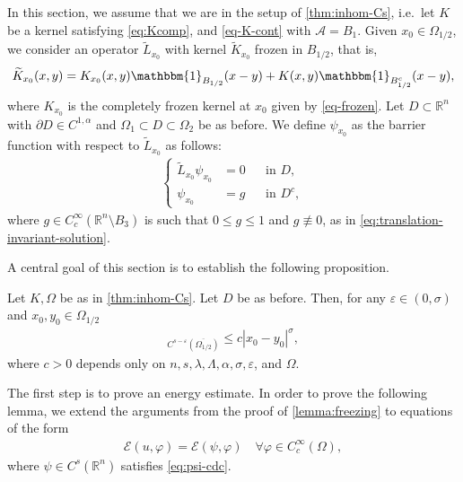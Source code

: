 \documentclass[11pt,reqno]{amsart}
\theoremstyle{plain}
\theoremstyle{definition}
\numberwithin{equation}{section}
\newcommand{\R}{\mathbb{R}}
\newcommand{\cE}{\mathcal{E}}
\newcommand{\eps}{\varepsilon}
\newcommand{\1}{\mathbbm{1}}
\begin{document}
In this section, we assume that we are in the setup of \autoref{thm:inhom-Cs}, i.e.\ let $K$ be a kernel satisfying \eqref{eq:Kcomp}, and \eqref{eq-K-cont} with $\mathcal{A} = B_1$.
Given $x_0 \in \Omega_{1/2}$, we consider an operator $\widetilde{L}_{x_0}$ with kernel $\widetilde{K}_{x_0}$ frozen in $B_{1/2}$, that is,
\begin{align}
\label{eq:locally-freeze}
    \widetilde{K}_{x_0}(x, y) = K_{x_0}(x, y) \1_{B_{1/2}}(x-y) + K(x, y) \1_{B_{1/2}^c}(x-y),
\end{align}
where $K_{x_0}$ is the completely frozen kernel at $x_0$ given by \eqref{eq-frozen}. Let $D \subset \R^n$ with $\partial D \in C^{1,\alpha}$ and $\Omega_1 \subset D \subset \Omega_2$ be as before.  We define $\psi_{x_0}$ as the barrier function with respect to $\widetilde{L}_{x_0}$ as follows:
\begin{align}
\label{eq:psi-PDE}
\left\{
\begin{aligned}
\widetilde{L}_{x_0} \psi_{x_0} &= 0 &&\text{in } D,\\
\psi_{x_0} &= g &&\text{in } D^c,
\end{aligned}
\right.
\end{align}
where $g \in C^{\infty}_c(\R^n \setminus B_3)$ is such that $0 \le g \le 1$ and $g \not\equiv 0$, as in \eqref{eq:translation-invariant-solution}.

A central goal of this section is to establish the following proposition.

\begin{proposition}
\label{lemma:w-regularity}
Let $K, \Omega$ be as in \autoref{thm:inhom-Cs}. Let $D$ be as before. Then, for any $\eps \in (0,\sigma)$ and $x_0, y_0 \in \Omega_{1/2}$
\begin{align*}
[\psi_{x_0} - \psi_{y_0}]_{C^{s-\eps}(\overline{\Omega_{1/2}})} \le c |x_0 - y_0|^{\sigma},
\end{align*}
where $c > 0$ depends only on $n,s,\lambda,\Lambda,\alpha,\sigma,\eps$, and $\Omega$.
\end{proposition}

The first step is to prove an energy estimate. In order to prove the following lemma, we extend the arguments from the proof of \autoref{lemma:freezing} to equations of the form
\begin{align*}
\cE(u,\varphi) = \cE(\psi,\varphi) 
\quad\forall \varphi \in C_c^{\infty}(\Omega),
\end{align*}
where $\psi \in C^s(\R^n)$ satisfies \eqref{eq:psi-cdc}.
\end{document}
